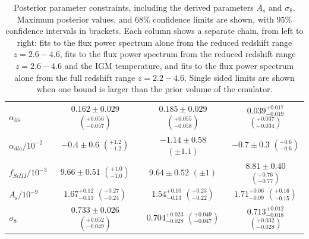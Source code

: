 \begin{table}
\begin{tabular} {| l | c | c | c|}
$\alpha_{lls}   $ & $0.162\pm 0.029   $ $\left(^{+0.056}_{-0.057}\right)$          & $0.185\pm 0.029$  $\left(^{+0.055}_{-0.058}\right)   $     & $0.039^{+0.017}_{-0.019}   $  $\left(^{+0.037}_{-0.034}\right)$   \\
$\alpha_{dla}/10^{-2}   $ & $-0.4\pm 0.6         $ $\left(^{+1.2}_{-1.2}\right)$ & $-1.14\pm 0.58$ $\left(\pm 1.1\right)  $    & $-0.7\pm 0.3         $   $\left(^{+0.6}_{-0.6}\right)$  \\
$f_{SiIII}/10^{-3} $ & $9.66\pm 0.51              $ $\left(^{+1.0}_{-1.0}\right)$              & $9.64\pm 0.52        $       $\left(\pm 1\right) $          & $8.81\pm 0.40        $  $\left(^{+0.76}_{-0.77}\right)$\\
\hline
$A_\mathrm{s}/10^{-9}      $ & $1.67^{+0.12}_{-0.13}$ $\left(^{+0.27}_{-0.24}\right)$ & $1.54^{+0.10}_{-0.13}$ $\left(^{+0.23}_{-0.22}\right)$  & $1.71^{+0.06}_{-0.09}$ $\left(^{+0.16}_{-0.15}\right)$   \\
$\sigma_8$ & $0.733\pm 0.026            $ $\left(^{+0.052}_{-0.049}\right)$ &  $0.704^{+0.023}_{-0.028}   $ $\left(^{+0.049}_{-0.047}\right)$ & $0.713^{+0.012}_{-0.018}$  $\left(^{+0.032}_{-0.028}\right)$  \\
\hline
\end{tabular}
\caption{\label{table:parameters}
Posterior parameter constraints, including the derived parameters $A_s$ and $\sigma_8$.
Maximum posterior values, and $68\%$ confidence limits are shown, with $95\%$ confidence intervals in brackets.
Each column shows a separate chain, from left to right: fits to the flux power spectrum alone from the reduced redshift range $z=2.6 - 4.6$, fits to the flux power spectrum from the reduced redshift range $z=2.6 - 4.6$ and the IGM temperature, and fits to the flux power spectrum alone from the full redshift range $z=2.2 - 4.6$.
Single sided limits are shown when one bound is larger than the prior volume of the emulator.
}
\end{table}


